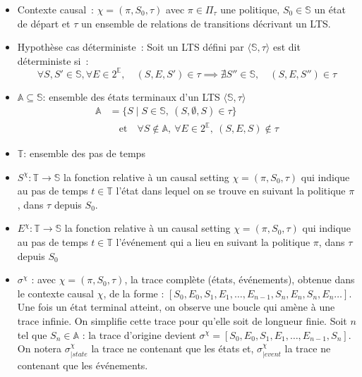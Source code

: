 \begin{itemize}
    


    \item Contexte causal : $\chi = (\pi, S_0,\tau)$ avec $\pi \in \Pi_\tau$ une politique, $S_0\in \mathds{S}$ un état de départ et $\tau$ un ensemble de relations de transitions décrivant un LTS. 
    
    \item Hypothèse cas déterministe : Soit un LTS défini par $\langle\mathds{S},\tau\rangle$ est dit déterministe si : 
        \begin{equation*}
            \forall S,S'\in \mathds{S}, \forall E\in 2^{\mathds{E}}, \quad (S,E,S')\in \tau \implies \nexists S'' \in \mathds{S}, \quad (S,E,S'')\in \tau
        \end{equation*}
    \item $\mathds{A} \subseteq \mathds{S}$: ensemble des états terminaux d'un LTS $\langle\mathds{S},\tau\rangle$
        \begin{equation*}
        \begin{aligned}
            \mathds{A} &= \{ S \mid S\in \mathds{S},\ (S,\emptyset,S) \in \tau \} \\
                    &\quad \text{et} \quad \forall S \notin \mathds{A},\ \forall E \in 2^{\mathds{E}},\ (S,E,S)\notin \tau
        \end{aligned}
        \end{equation*}
    \item $\mathds{T}$: ensemble des pas de temps
    
    \item $S^\chi: \mathds{T}\to \mathds{S}$ la fonction relative à un causal setting $\chi = (\pi,S_0,\tau)$ qui indique au pas de temps $t\in \mathds{T}$ l'état dans lequel on se trouve en suivant la politique $\pi$, dans $\tau$ depuis $S_0$.

    \item $E^\chi: \mathds{T}\to \mathds{S}$ la fonction relative à un causal setting $\chi = (\pi,S_0,\tau)$ qui indique au pas de temps $t\in \mathds{T}$ l'événement qui a lieu en suivant la politique $\pi$, dans $\tau$ depuis $S_0$
    
    \item $\sigma^\chi$ : avec $\chi = (\pi,S_0,\tau)$, la trace complète (états, événements), obtenue dans le contexte causal $\chi$, de la forme : $[S_0,E_0,S_1,E_1,\dots,E_{n-1},S_n,E_n,S_n,E_n\dots] $. Une fois un état terminal atteint, on observe une boucle qui amène à une trace infinie. On simplifie cette trace pour qu'elle soit de longueur finie. Soit $n$ tel que $S_n\in \mathds{A}$ : la trace d'origine devient $\sigma^\chi=[S_0,E_0,S_1,E_1,\dots,E_{n-1},S_n]$. On notera $\sigma^{\chi}_{|state}$ la trace ne contenant que les états et, $\sigma^{\chi}_{|event}$ la trace ne contenant que les événements.
    


\end{itemize}
